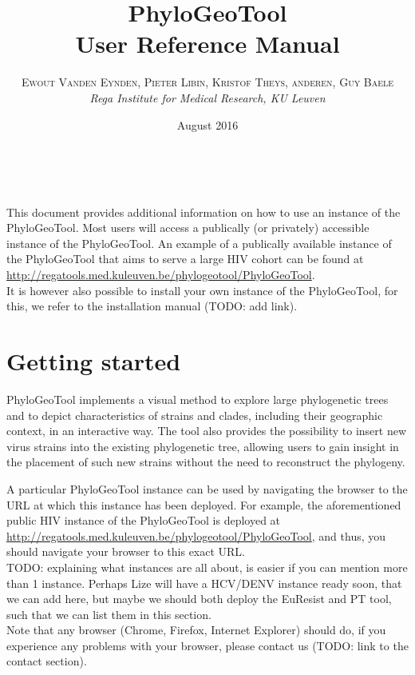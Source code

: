 \documentclass[a4paper, 11pt]{article} %
\title{\textbf{PhyloGeoTool}\\ %
User Reference Manual} %
\author{\textsc{Ewout Vanden Eynden, Pieter Libin, Kristof Theys, anderen, Guy Baele} %
\\{\textit{Rega Institute for Medical Research, KU Leuven}}} %
\date{August 2016} %
\makeatletter
\renewcommand{\maketitle}{ %
\begin{flushright} %
{\LARGE\@title} %

\vspace{50pt} %

{\large\@author} %
\\\@date %

\vspace{40pt} %
\end{flushright}
}
\makeatother
\begin{document}
\maketitle %

\vspace{30pt} %

\tableofcontents
\newpage

This document provides additional information on how to use an instance of the PhyloGeoTool. Most users will access a publically (or privately) accessible instance of the PhyloGeoTool. An example of a publically available instance of the PhyloGeoTool that aims to serve a large HIV cohort can be found at \url{http://regatools.med.kuleuven.be/phylogeotool/PhyloGeoTool}.\\
It is however also possible to install your own instance of the PhyloGeoTool, for this, we refer to the installation manual (TODO: add link).

\section{Getting started}

PhyloGeoTool implements a visual method to explore large phylogenetic trees and to depict characteristics of strains and clades, including their geographic context, in an interactive way.
The tool also provides the possibility to insert new virus strains into the existing phylogenetic tree, allowing users to gain insight in the placement of such new strains without the need to reconstruct the phylogeny.

A particular PhyloGeoTool instance can be used by navigating the browser to the URL at which this instance has been deployed. For example, the aforementioned public HIV instance of the PhyloGeoTool is deployed at \url{http://regatools.med.kuleuven.be/phylogeotool/PhyloGeoTool}, and thus, you should navigate your browser to this exact URL.\\
TODO: explaining what instances are all about, is easier if you can mention more than 1 instance. Perhaps Lize will have a HCV/DENV instance ready soon, that we can add here, but maybe we should both deploy the EuResist and PT tool, such that we can list them in this section.\\
Note that any browser (Chrome, Firefox, Internet Explorer) should do, if you experience any problems with your browser, please contact us (TODO: link to the contact section).
\end{document}
